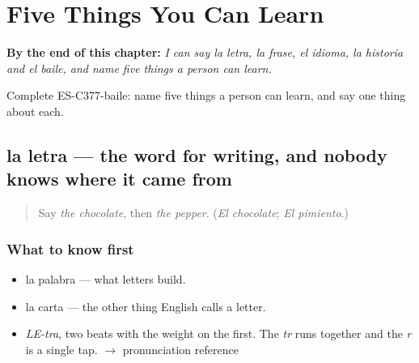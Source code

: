 
\chapter{Five Things You Can Learn}
\label{ch:la-letra-y-la-frase}

\begin{chapteropening}
\textbf{By the end of this chapter:} \emph{I can say la letra, la frase, el idioma, la historia and el baile, and name five things a person can learn.}

Complete ES-C377-baile: name five things a person can learn, and say one thing about each.
\end{chapteropening}

\section[la letra]{la letra — the word for writing, and nobody knows where it came from}

\label{lesson:ES-C377-letra}



\begin{quote}
Say \emph{the chocolate}, then \emph{the pepper}. (\emph{El chocolate}; \emph{El pimiento}.)
\end{quote}

\subsection*{What to know first}
\begin{itemize}
\raggedright
  \item la palabra — what letters build.
  \item la carta — the other thing English calls a letter.
\end{itemize}

\begin{sounds}
\begin{itemize}
\raggedright
  \item \emph{LE-tra}, two beats with the weight on the first. The \emph{tr} runs together and the \emph{r} is a single tap. $\to$ pronunciation reference
\end{itemize}
\end{sounds}

